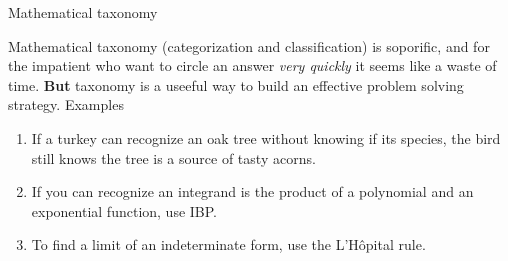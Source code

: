 \documentclass[portrait,fleqn,12pt]{beamer}
\newenvironment{handlist}
   {\begin{enumerate}[\faHandPointRight]
       \addtolength{\itemsep}{0.0\itemsep}}
     {\end{enumerate}}
\begin{document}
\begin{frame}{Mathematical taxonomy}

 Mathematical taxonomy (categorization  and  classification)  is  soporific, and for the impatient who want to circle an answer
 \emph{very quickly}  it seems like a waste of time.  \textbf{But} taxonomy is a useeful way to build an effective problem solving strategy. 
 Examples
\begin{handlist}

\item If a turkey can recognize an oak tree without knowing if its species, the bird still knows the tree is a source of tasty acorns.
 
\item If  you can recognize an integrand is the product of a polynomial and an exponential function, use IBP.
\item To find a limit of an indeterminate form, use the L'Hôpital rule.

\end{handlist}
\end{frame}
\end{document}

